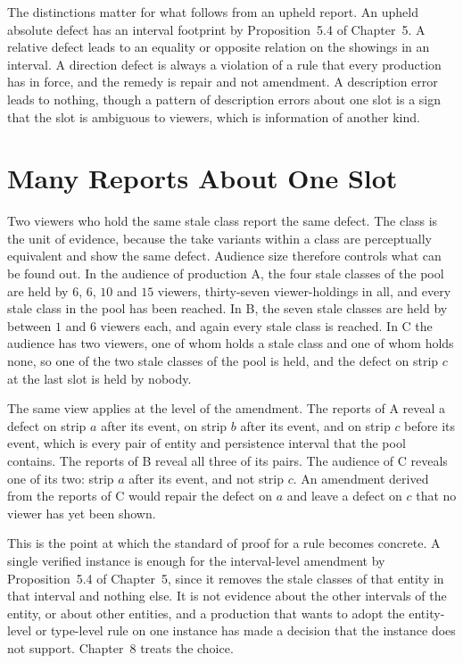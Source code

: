 \documentclass[11pt,twoside,openright]{book}
\theoremstyle{plain}
\theoremstyle{definition}
\theoremstyle{remark}
\begin{document}
The distinctions matter for what follows from an upheld report. An upheld absolute defect has an interval footprint by Proposition~5.4 of Chapter~5. A relative defect leads to an equality or opposite relation on the showings in an interval. A direction defect is always a violation of a rule that every production has in force, and the remedy is repair and not amendment. A description error leads to nothing, though a pattern of description errors about one slot is a sign that the slot is ambiguous to viewers, which is information of another kind.

\section{Many Reports About One Slot}\label{sec:aggregate}

Two viewers who hold the same stale class report the same defect. The class is the unit of evidence, because the take variants within a class are perceptually equivalent and show the same defect. Audience size therefore controls what can be found out. In the audience of production A, the four stale classes of the pool are held by $6$, $6$, $10$ and $15$ viewers, thirty-seven viewer-holdings in all, and every stale class in the pool has been reached. In B, the seven stale classes are held by between $1$ and $6$ viewers each, and again every stale class is reached. In C the audience has two viewers, one of whom holds a stale class and one of whom holds none, so one of the two stale classes of the pool is held, and the defect on strip $c$ at the last slot is held by nobody.

The same view applies at the level of the amendment. The reports of A reveal a defect on strip $a$ after its event, on strip $b$ after its event, and on strip $c$ before its event, which is every pair of entity and persistence interval that the pool contains. The reports of B reveal all three of its pairs. The audience of C reveals one of its two: strip $a$ after its event, and not strip $c$. An amendment derived from the reports of C would repair the defect on $a$ and leave a defect on $c$ that no viewer has yet been shown.

This is the point at which the standard of proof for a rule becomes concrete. A single verified instance is enough for the interval-level amendment by Proposition~5.4 of Chapter~5, since it removes the stale classes of that entity in that interval and nothing else. It is not evidence about the other intervals of the entity, or about other entities, and a production that wants to adopt the entity-level or type-level rule on one instance has made a decision that the instance does not support. Chapter~8 treats the choice.
\end{document}
